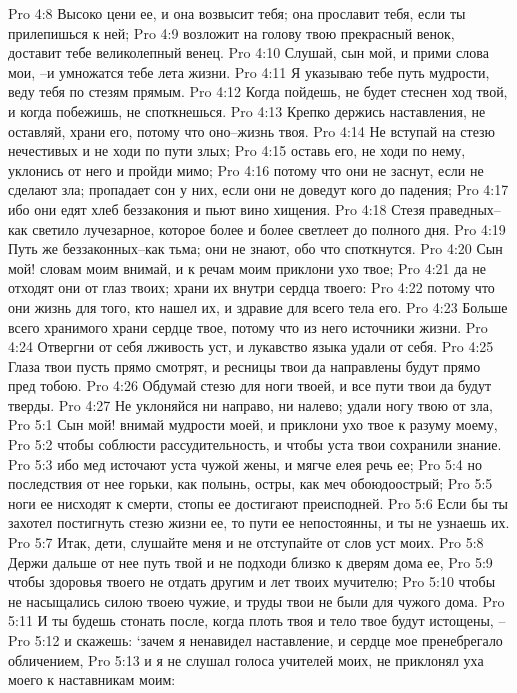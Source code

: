 Pro 4:8  Высоко цени ее, и она возвысит тебя; она прославит тебя, если ты прилепишься к ней;
Pro 4:9  возложит на голову твою прекрасный венок, доставит тебе великолепный венец.
Pro 4:10  Слушай, сын мой, и прими слова мои, --и умножатся тебе лета жизни.
Pro 4:11  Я указываю тебе путь мудрости, веду тебя по стезям прямым.
Pro 4:12  Когда пойдешь, не будет стеснен ход твой, и когда побежишь, не споткнешься.
Pro 4:13  Крепко держись наставления, не оставляй, храни его, потому что оно--жизнь твоя.
Pro 4:14  Не вступай на стезю нечестивых и не ходи по пути злых;
Pro 4:15  оставь его, не ходи по нему, уклонись от него и пройди мимо;
Pro 4:16  потому что они не заснут, если не сделают зла; пропадает сон у них, если они не доведут кого до падения;
Pro 4:17  ибо они едят хлеб беззакония и пьют вино хищения.
Pro 4:18  Стезя праведных--как светило лучезарное, которое более и более светлеет до полного дня.
Pro 4:19  Путь же беззаконных--как тьма; они не знают, обо что споткнутся.
Pro 4:20  Сын мой! словам моим внимай, и к речам моим приклони ухо твое;
Pro 4:21  да не отходят они от глаз твоих; храни их внутри сердца твоего:
Pro 4:22  потому что они жизнь для того, кто нашел их, и здравие для всего тела его.
Pro 4:23  Больше всего хранимого храни сердце твое, потому что из него источники жизни.
Pro 4:24  Отвергни от себя лживость уст, и лукавство языка удали от себя.
Pro 4:25  Глаза твои пусть прямо смотрят, и ресницы твои да направлены будут прямо пред тобою.
Pro 4:26  Обдумай стезю для ноги твоей, и все пути твои да будут тверды.
Pro 4:27  Не уклоняйся ни направо, ни налево; удали ногу твою от зла,
Pro 5:1  Сын мой! внимай мудрости моей, и приклони ухо твое к разуму моему,
Pro 5:2  чтобы соблюсти рассудительность, и чтобы уста твои сохранили знание.
Pro 5:3  ибо мед источают уста чужой жены, и мягче елея речь ее;
Pro 5:4  но последствия от нее горьки, как полынь, остры, как меч обоюдоострый;
Pro 5:5  ноги ее нисходят к смерти, стопы ее достигают преисподней.
Pro 5:6  Если бы ты захотел постигнуть стезю жизни ее, то пути ее непостоянны, и ты не узнаешь их.
Pro 5:7  Итак, дети, слушайте меня и не отступайте от слов уст моих.
Pro 5:8  Держи дальше от нее путь твой и не подходи близко к дверям дома ее,
Pro 5:9  чтобы здоровья твоего не отдать другим и лет твоих мучителю;
Pro 5:10  чтобы не насыщались силою твоею чужие, и труды твои не были для чужого дома.
Pro 5:11  И ты будешь стонать после, когда плоть твоя и тело твое будут истощены, --
Pro 5:12  и скажешь: `зачем я ненавидел наставление, и сердце мое пренебрегало обличением,
Pro 5:13  и я не слушал голоса учителей моих, не приклонял уха моего к наставникам моим:
